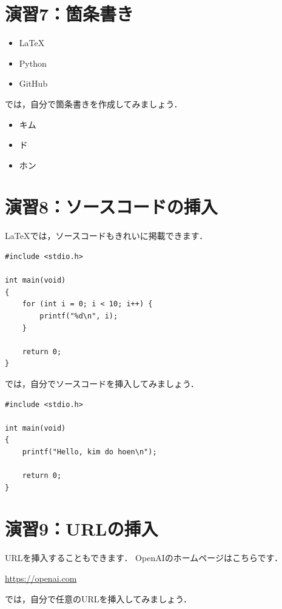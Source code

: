 \documentclass[a4paper,twocolumn,pdflatex,ja=standard]{bxjsarticle}
\begin{document}
\section*{演習7：箇条書き}
\begin{itemize}
    \item LaTeX
    \item Python
    \item GitHub
\end{itemize}

では，自分で箇条書きを作成してみましょう．


\begin{itemize}
    \item キム
    \item ド
    \item ホン
\end{itemize}

\section*{演習8：ソースコードの挿入}
LaTeXでは，ソースコードもきれいに掲載できます．

\begin{lstlisting}
#include <stdio.h>

int main(void)
{
    for (int i = 0; i < 10; i++) {
        printf("%d\n", i);
    }

    return 0;
}
\end{lstlisting}

では，自分でソースコードを挿入してみましょう．


\begin{lstlisting}
#include <stdio.h>

int main(void)
{
    printf("Hello, kim do hoen\n");

    return 0;
}
\end{lstlisting}

\section*{演習9：URLの挿入}
URLを挿入することもできます．
OpenAIのホームページはこちらです．

\url{https://openai.com}

では，自分で任意のURLを挿入してみましょう．

\end{document}
